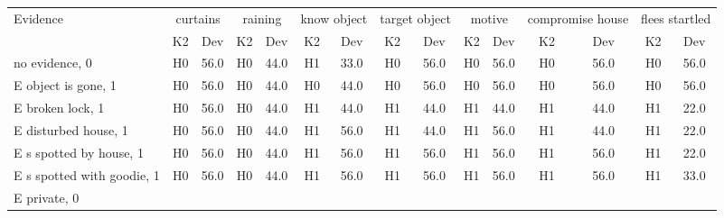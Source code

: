 \begin{table}\begin{tabular}{l|cc|cc|cc|cc|cc|cc|cc}\toprule\multirow{2}{*}{Evidence} & \multicolumn{2}{c}{curtains}& \multicolumn{2}{c}{raining}& \multicolumn{2}{c}{know object}& \multicolumn{2}{c}{target object}& \multicolumn{2}{c}{motive}& \multicolumn{2}{c}{compromise house}& \multicolumn{2}{c}{flees startled}\\& {K2} & {Dev}& {K2} & {Dev}& {K2} & {Dev}& {K2} & {Dev}& {K2} & {Dev}& {K2} & {Dev}& {K2} & {Dev}\\\midrule
no evidence, 0 & \cellcolor{Bittersweet}H0&\cellcolor{Bittersweet}56.0&\cellcolor{Bittersweet}H0&\cellcolor{Bittersweet}44.0&\cellcolor{Bittersweet}H1&\cellcolor{Bittersweet}33.0&\cellcolor{Bittersweet}H0&\cellcolor{Bittersweet}56.0&\cellcolor{Bittersweet}H0&\cellcolor{Bittersweet}56.0&\cellcolor{Bittersweet}H0&\cellcolor{Bittersweet}56.0&\cellcolor{Bittersweet}H0&\cellcolor{Bittersweet}56.0\\E object is gone, 1 & \cellcolor{Bittersweet}H0&\cellcolor{Bittersweet}56.0&\cellcolor{Bittersweet}H0&\cellcolor{Bittersweet}44.0&\cellcolor{Bittersweet}H0&\cellcolor{Bittersweet}44.0&\cellcolor{Bittersweet}H0&\cellcolor{Bittersweet}56.0&\cellcolor{Bittersweet}H0&\cellcolor{Bittersweet}56.0&\cellcolor{Bittersweet}H0&\cellcolor{Bittersweet}56.0&\cellcolor{Bittersweet}H0&\cellcolor{Bittersweet}56.0\\E broken lock, 1 & \cellcolor{Bittersweet}H0&\cellcolor{Bittersweet}56.0&\cellcolor{Bittersweet}H0&\cellcolor{Bittersweet}44.0&\cellcolor{Bittersweet}H1&\cellcolor{Bittersweet}44.0&\cellcolor{Bittersweet}H1&\cellcolor{Bittersweet}44.0&\cellcolor{Bittersweet}H1&\cellcolor{Bittersweet}44.0&\cellcolor{Bittersweet}H1&\cellcolor{Bittersweet}44.0&\cellcolor{Bittersweet}H1&\cellcolor{Bittersweet}22.0\\E disturbed house, 1 & \cellcolor{Bittersweet}H0&\cellcolor{Bittersweet}56.0&\cellcolor{Bittersweet}H0&\cellcolor{Bittersweet}44.0&\cellcolor{Bittersweet}H1&\cellcolor{Bittersweet}56.0&\cellcolor{Bittersweet}H1&\cellcolor{Bittersweet}44.0&\cellcolor{Bittersweet}H1&\cellcolor{Bittersweet}56.0&\cellcolor{Bittersweet}H1&\cellcolor{Bittersweet}44.0&\cellcolor{Bittersweet}H1&\cellcolor{Bittersweet}22.0\\E s spotted by house, 1 & \cellcolor{Bittersweet}H0&\cellcolor{Bittersweet}56.0&\cellcolor{Bittersweet}H0&\cellcolor{Bittersweet}44.0&\cellcolor{Bittersweet}H1&\cellcolor{Bittersweet}56.0&\cellcolor{Bittersweet}H1&\cellcolor{Bittersweet}56.0&\cellcolor{Bittersweet}H1&\cellcolor{Bittersweet}56.0&\cellcolor{Bittersweet}H1&\cellcolor{Bittersweet}56.0&\cellcolor{Bittersweet}H1&\cellcolor{Bittersweet}22.0\\E s spotted with goodie, 1 & \cellcolor{Bittersweet}H0&\cellcolor{Bittersweet}56.0&\cellcolor{Bittersweet}H0&\cellcolor{Bittersweet}44.0&\cellcolor{Bittersweet}H1&\cellcolor{Bittersweet}56.0&\cellcolor{Bittersweet}H1&\cellcolor{Bittersweet}56.0&\cellcolor{Bittersweet}H1&\cellcolor{Bittersweet}56.0&\cellcolor{Bittersweet}H1&\cellcolor{Bittersweet}56.0&\cellcolor{Bittersweet}H1&\cellcolor{Bittersweet}33.0\\E private, 0 & 
\end{tabular}
\end{table}
